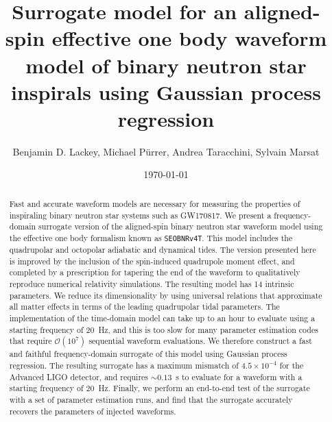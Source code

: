 \documentclass[prd,aps,letter,twocolumn,floatfix,notitlepage,nofootinbib]{revtex4-1}
\begin{document}
\title{Surrogate model for an aligned-spin effective one body waveform model of binary neutron star inspirals using Gaussian process regression}

\author{
Benjamin D. Lackey, 
Michael P\"{u}rrer, 
Andrea Taracchini,
Sylvain Marsat
}

\date{\today}

\begin{abstract}

Fast and accurate waveform models are necessary for measuring the properties of inspiraling binary neutron star systems such as GW170817. We present a frequency-domain surrogate version of the aligned-spin binary neutron star waveform model using the effective one body formalism known as \texttt{SEOBNRv4T}. This model includes the quadrupolar and octopolar adiabatic and dynamical tides. The version presented here is improved by the inclusion of the spin-induced quadrupole moment effect, and completed by a prescription for tapering the end of the waveform to qualitatively reproduce numerical relativity simulations. The resulting model has 14 intrinsic parameters. We reduce its dimensionality by using universal relations that approximate all matter effects in terms of the leading quadrupolar tidal parameters. The implementation of the time-domain model can take up to an hour to evaluate using a starting frequency of 20~Hz, and this is too slow for many parameter estimation codes that require $\mathcal{O}(10^7)$ sequential waveform evaluations. We therefore construct a fast and faithful frequency-domain surrogate of this model using Gaussian process regression. The resulting surrogate has a maximum mismatch of $4.5\times 10^{-4}$ for the Advanced LIGO detector, and requires $\sim 0.13$~s to evaluate for a waveform with a starting frequency of 20~Hz. Finally, we perform an end-to-end test of the surrogate with a set of parameter estimation runs, and find that the surrogate accurately recovers the parameters of injected waveforms. 

\end{abstract}

\end{document}
